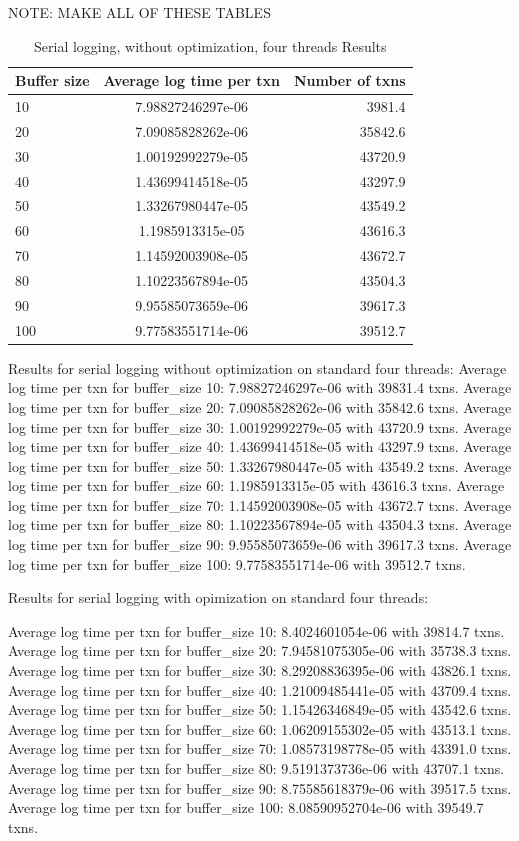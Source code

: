 NOTE: MAKE ALL OF THESE TABLES
\begin{table}[h!]
  \centering
  \caption{Serial logging, without optimization, four threads Results}
  \label{tab:table1}
  \begin{tabular}{l|c|r}
    Buffer size & Average log time per txn & Number of txns\\
    \hline
    10 &  7.98827246297e-06 & 3981.4\\
    \hline
    20 &  7.09085828262e-06 & 35842.6\\
    \hline
    30 & 1.00192992279e-05 & 43720.9\\
    \hline
    40 & 1.43699414518e-05 & 43297.9\\
    \hline
    50 &  1.33267980447e-05 & 43549.2\\
    \hline
    60 &  1.1985913315e-05 & 43616.3\\
    \hline
    70 &  1.14592003908e-05  & 43672.7\\
    \hline
    80 &  1.10223567894e-05 & 43504.3\\
    \hline
    90 &  9.95585073659e-06 & 39617.3\\
    \hline
    100 &  9.77583551714e-06  & 39512.7\\
  \end{tabular}
\end{table}
Results for serial logging without optimization on standard four threads:
Average log time per txn for buffer_size 10: 7.98827246297e-06 with 39831.4 txns.
Average log time per txn for buffer_size 20: 7.09085828262e-06 with 35842.6 txns.
Average log time per txn for buffer_size 30: 1.00192992279e-05 with 43720.9 txns.
Average log time per txn for buffer_size 40: 1.43699414518e-05 with 43297.9 txns.
Average log time per txn for buffer_size 50: 1.33267980447e-05 with 43549.2 txns.
Average log time per txn for buffer_size 60: 1.1985913315e-05 with 43616.3 txns.
Average log time per txn for buffer_size 70: 1.14592003908e-05 with 43672.7 txns.
Average log time per txn for buffer_size 80: 1.10223567894e-05 with 43504.3 txns.
Average log time per txn for buffer_size 90: 9.95585073659e-06 with 39617.3 txns.
Average log time per txn for buffer_size 100: 9.77583551714e-06 with 39512.7 txns.


Results for serial logging with opimization on standard four threads:


Average log time per txn for buffer_size 10: 8.4024601054e-06 with 39814.7 txns.
Average log time per txn for buffer_size 20: 7.94581075305e-06 with 35738.3 txns.
Average log time per txn for buffer_size 30: 8.29208836395e-06 with 43826.1 txns.
Average log time per txn for buffer_size 40: 1.21009485441e-05 with 43709.4 txns.
Average log time per txn for buffer_size 50: 1.15426346849e-05 with 43542.6 txns.
Average log time per txn for buffer_size 60: 1.06209155302e-05 with 43513.1 txns.
Average log time per txn for buffer_size 70: 1.08573198778e-05 with 43391.0 txns.
Average log time per txn for buffer_size 80: 9.5191373736e-06 with 43707.1 txns.
Average log time per txn for buffer_size 90: 8.75585618379e-06 with 39517.5 txns.
Average log time per txn for buffer_size 100: 8.08590952704e-06 with 39549.7 txns.


